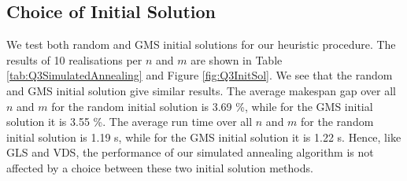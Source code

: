 \documentclass[12pt,a4paper,reqno]{article}
\begin{document}
\begin{figure}[H]
\end{figure}



\subsection*{Choice of Initial Solution}
We test both random and GMS initial solutions for our heuristic procedure. The results of 10 realisations per $n$ and $m$ are shown in Table \ref{tab:Q3SimulatedAnnealing} and Figure \ref{fig:Q3InitSol}. We see that the random and GMS initial solution give similar results. The average makespan gap over all $n$ and $m$ for the random initial solution is 3.69 \%, while for the GMS initial solution it is 3.55 \%. The average run time over all $n$ and $m$ for the random initial solution is 1.19 s, while for the GMS initial solution it is 1.22 s. Hence, like GLS and VDS, the performance of our simulated annealing algorithm is not affected by a choice between these two initial solution methods.
\end{document}
